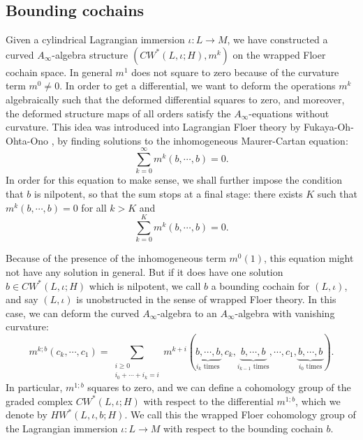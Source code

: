 \documentclass{amsart}
\numberwithin{equation}{section}
\numberwithin{figure}{section}
\begin{document}
\subsection{Bounding cochains}
	Given a cylindrical Lagrangian immersion $\iota: L \to M$, we have constructed a curved $A_{\infty}$-algebra structure $(CW^{*}(L, \iota; H), m^{k})$ on the wrapped Floer cochain space. In general $m^{1}$ does not square to zero because of the curvature term $m^{0} \neq 0$. In order to get a differential, we want to deform the operations $m^{k}$ algebraically such that the deformed differential squares to zero, and moreover, the deformed structure maps of all orders satisfy the $A_{\infty}$-equations without curvature. This idea was introduced into Lagrangian Floer theory by Fukaya-Oh-Ohta-Ono \cite{FOOO1}, by finding solutions to the inhomogeneous Maurer-Cartan equation:
\begin{equation} \label{inhomogeneous Maurer-Cartan equation}
\sum_{k = 0}^{\infty} m^{k}(b, \cdots, b) = 0.
\end{equation}
In order for this equation to make sense, we shall further impose the condition that $b$ is nilpotent, so that the sum stops at a final stage: there exists $K$ such that $m^{k}(b, \cdots, b) = 0$ for all $k > K$ and 
\begin{equation*}
\sum_{k = 0}^{K} m^{k}(b, \cdots, b) = 0.
\end{equation*} \par
	Because of the presence of the inhomogeneous term $m^{0}(1)$, this equation might not have any solution in general. But if it does have one solution $b \in CW^{*}(L, \iota; H)$ which is nilpotent, we call $b$ a bounding cochain for $(L, \iota)$, and say $(L, \iota)$ is unobstructed in the sense of wrapped Floer theory. In this case, we can deform the curved $A_{\infty}$-algebra to an $A_{\infty}$-algebra with vanishing curvature:
\begin{equation} \label{deform the A-infinity algebra by MC elements}
m^{k; b}(c_{k}, \cdots, c_{1}) = \sum_{\substack{i \ge 0\\ i_{0} + \cdots + i_{k} = i}} m^{k+i}(\underbrace{b, \cdots, b}_{\text{$i_{k}$ times}}, c_{k}, \underbrace{b, \cdots, b}_{\text{$i_{k-1}$ times}}, \cdots, c_{1}, \underbrace{b, \cdots, b}_{\text{$i_{0}$ times}}).
\end{equation}
In particular, $m^{1; b}$ squares to zero, and we can define a cohomology group of the graded complex $CW^{*}(L, \iota; H)$ with respect to the differential $m^{1; b}$, which we denote by $HW^{*}(L, \iota, b; H)$. We call this the wrapped Floer cohomology group of the Lagrangian immersion $\iota: L \to M$ with respect to the bounding cochain $b$. \par
\end{document}
